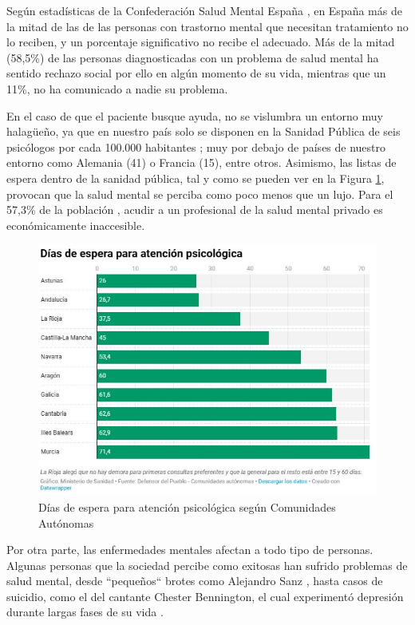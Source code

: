     Según estadísticas de la Confederación Salud Mental España \cite{confederacion_salud_mental_espana_salud_nodate} \cite{aguilar_laura_2022}, en España más de la mitad de las de las personas con trastorno mental que necesitan tratamiento no lo reciben, y un porcentaje significativo no recibe el adecuado. Más de la mitad (58,5\%) de las personas diagnosticadas con un problema de salud mental ha sentido rechazo social por ello en algún momento de su vida, mientras que un 11\%, no ha comunicado a nadie su problema.
    
    
    En el caso de que el paciente busque ayuda, no se vislumbra un entorno muy halagüeño, ya que en nuestro país solo se disponen en la Sanidad Pública de seis psicólogos por cada 100.000 habitantes \cite{antolin_listas_2023}; muy por debajo de países de nuestro entorno como Alemania (41) o Francia (15), entre otros. Asimismo, las listas de espera dentro de la sanidad pública, tal y como se pueden ver en la Figura \ref{fig:intro:dias_espera}, provocan que la salud mental se perciba como poco menos que un lujo. Para el 57,3\% de la población \cite{comunicacion_cuatro_2023}, acudir a un profesional de la salud mental privado es económicamente inaccesible.
    
    \begin{figure}[h]
        \centering
        \includegraphics[width=0.75\linewidth]{figures/dias espera.JPG}
        \caption[Días de espera para atención psicológica según Comunidades Autónomas]{Días de espera para atención psicológica según Comunidades Autónomas \cite{asuar_gallego_recurrir_2021}}
        \label{fig:intro:dias_espera}
    \end{figure}

    Por otra parte, las enfermedades mentales afectan a todo tipo de personas. Algunas personas que la sociedad percibe como exitosas han sufrido problemas de salud mental, desde ``pequeños`` brotes como Alejandro Sanz \cite{lopez_chicon_que_2023} \cite{riano_alejandro_2023}, hasta casos de suicidio, como el del cantante Chester Bennington, el cual experimentó depresión durante largas fases de su vida \cite{el_universal_nada_2020} \cite{gambin_historia_2022}.

